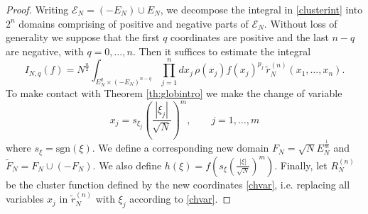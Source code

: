 \documentclass[11pt,reqno]{amsproc}
\numberwithin{equation}{section}
\numberwithin{theorem}{section}
\begin{document}
\begin{proof}
Writing $\mathcal{E}_{N} = (-E_{N})\cup E_{N}$, we decompose the integral in \eqref{clusterint} into $2^{n}$ domains comprising of positive and negative parts of $\mathcal{E}_{N}$. Without loss of generality we suppose that the first $q$ coordinates are positive and the last $n-q$ are negative, with $q=0,\ldots,n$. Then it suffices to estimate the integral
\begin{equation}
I_{N,q}(f) = N^{\frac{n}{2}}\int_{E_{N}^{q} \times (-E_{N})^{n-q}}\prod_{j=1}^{n}dx_{j}\,\rho(x_j)f(x_j)^{p_j}\,\tilde{r}^{(n)}_{N}(x_1,\ldots,x_n).
\end{equation}
To make contact with Theorem \ref{th:globintro} we make the change of variable
\begin{equation}
x_{j} = s_{\xi_j}\left(\frac{|\xi_{j}|}{\sqrt{N}}\right)^{m},\qquad j=1,\ldots,m \label{chvar}
\end{equation}
where $s_{\xi} = \mathrm{sgn}(\xi)$. We define a corresponding new domain $F_{N} = \sqrt{N}E_{N}^{\frac{1}{m}}$ and
 $\tilde{F}_{N} = F_{N}\cup(-F_{N})$. We also define 
$h(\xi) = f\left(s_{\xi}\left(\frac{\lvert \xi \rvert}{\sqrt{N}}\right)^{m}\right)$. 
Finally, let $R^{(n)}_{N}$ be the cluster function defined by the new coordinates \eqref{chvar}, i.e. replacing all variables $x_{j}$ in $\tilde{r}^{(n)}_{N}$ with $\xi_{j}$ according to \eqref{chvar}. 


\end{proof}
\end{document}
